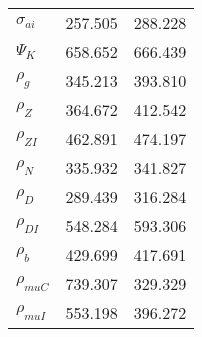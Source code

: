\begin{center}
\begin{longtable}{lcc}
$ {\sigma_{ai}}        $	 & 	     257.505	 & 	     288.228 \\ 
$ {\Psi_{K}}           $	 & 	     658.652	 & 	     666.439 \\ 
$ {\rho_g}             $	 & 	     345.213	 & 	     393.810 \\ 
$ {\rho_Z}             $	 & 	     364.672	 & 	     412.542 \\ 
$ {\rho_{ZI}}          $	 & 	     462.891	 & 	     474.197 \\ 
$ {\rho_N}             $	 & 	     335.932	 & 	     341.827 \\ 
$ {\rho_D}             $	 & 	     289.439	 & 	     316.284 \\ 
$ {\rho_{DI}}          $	 & 	     548.284	 & 	     593.306 \\ 
$ {\rho_b}             $	 & 	     429.699	 & 	     417.691 \\ 
$ {\rho_{muC}}         $	 & 	     739.307	 & 	     329.329 \\ 
$ {\rho_{muI}}         $	 & 	     553.198	 & 	     396.272 \\ 
\end{longtable}
 \end{center}
